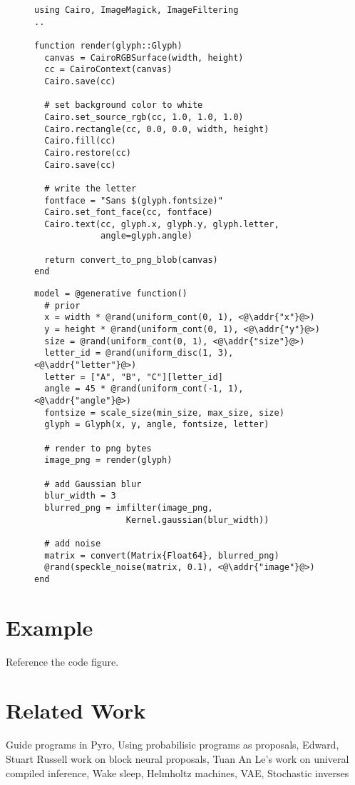 \documentclass{article}
\begin{document}
\begin{figure}[t]
\begin{minipage}[t]{0.5\textwidth}
\begin{lstlisting}
using Cairo, ImageMagick, ImageFiltering
..

function render(glyph::Glyph)
  canvas = CairoRGBSurface(width, height)
  cc = CairoContext(canvas)
  Cairo.save(cc)

  # set background color to white
  Cairo.set_source_rgb(cc, 1.0, 1.0, 1.0)
  Cairo.rectangle(cc, 0.0, 0.0, width, height)
  Cairo.fill(cc)
  Cairo.restore(cc)
  Cairo.save(cc)

  # write the letter
  fontface = "Sans $(glyph.fontsize)"
  Cairo.set_font_face(cc, fontface)
  Cairo.text(cc, glyph.x, glyph.y, glyph.letter,
             angle=glyph.angle)

  return convert_to_png_blob(canvas)
end
\end{lstlisting}
\end{minipage}%
\begin{minipage}[t]{0.5\textwidth}
\begin{lstlisting}
model = @generative function()
  # prior
  x = width * @rand(uniform_cont(0, 1), <@\addr{"x"}@>)
  y = height * @rand(uniform_cont(0, 1), <@\addr{"y"}@>)
  size = @rand(uniform_cont(0, 1), <@\addr{"size"}@>)
  letter_id = @rand(uniform_disc(1, 3), <@\addr{"letter"}@>)
  letter = ["A", "B", "C"][letter_id]
  angle = 45 * @rand(uniform_cont(-1, 1), <@\addr{"angle"}@>)
  fontsize = scale_size(min_size, max_size, size)
  glyph = Glyph(x, y, angle, fontsize, letter)

  # render to png bytes
  image_png = render(glyph)

  # add Gaussian blur
  blur_width = 3
  blurred_png = imfilter(image_png,
                  Kernel.gaussian(blur_width))

  # add noise
  matrix = convert(Matrix{Float64}, blurred_png)
  @rand(speckle_noise(matrix, 0.1), <@\addr{"image"}@>)
end
\end{lstlisting}
\end{minipage}
\end{figure}

\section{Example}
Reference the code figure.

\section{Related Work}
Guide programs in Pyro,
Using probabilisic programs as proposals,
Edward,
Stuart Russell work on block neural proposals,
Tuan An Le's work on univeral compiled inference,
Wake sleep,
Helmholtz machines,
VAE,
Stochastic inverses
\end{document}
